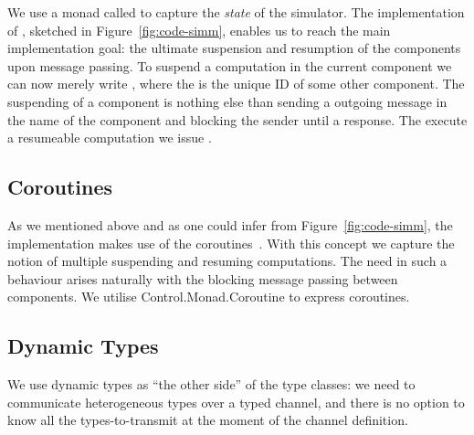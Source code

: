 We use a monad called  to capture the \emph{state} of the simulator.
The implementation of , sketched in Figure~\ref{fig:code-simm}, enables us to reach the main implementation goal: the ultimate suspension and resumption of the components upon message passing.
To suspend a computation in the current component we can now merely write , where the  is the unique ID of some other component.
The suspending of a component is nothing else than sending a outgoing message in the name of the component and blocking the sender until a response.
The execute a resumeable computation we issue  \mbox{.} %


\subsection{Coroutines}
\label{sec:impl-coroutines}
As we mentioned above and as one could infer from Figure~\ref{fig:code-simm}, the implementation makes use of the coroutines~\cite{coroutines}.
With this concept we capture the notion of multiple suspending and resuming computations.
The need in such a behaviour arises naturally with the blocking message passing between components.
We utilise \textsf{Control.Monad.Coroutine} \cite{cmt} to express coroutines.

\subsection{Dynamic Types}
We use dynamic types \cite{Abadi:1991:DTS:103135.103138} as ``the other side'' of the type classes: we need to communicate heterogeneous types over a typed channel, and there is no option to know all the types-to-transmit at the moment of the channel definition.



